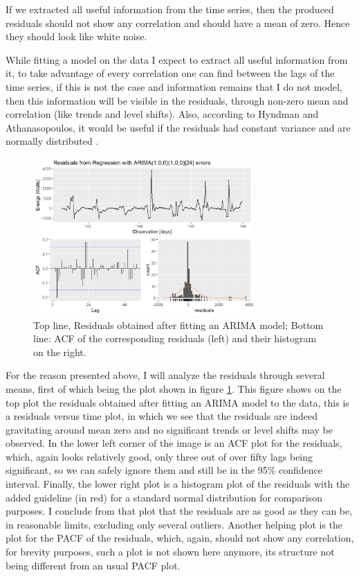 \documentclass[12pt,a4paper,titlepage]{report}
\begin{document}
If we extracted all useful information from the time series, then the produced residuals should not show any correlation and should have a mean of zero. Hence they should look like white noise. 

While fitting a model on the data I expect to extract all useful information from it, to take advantage of every correlation one can find between the lags of the time series, if this is not the case and information remains that I do not model, then this information will be visible in the residuals, through non-zero mean and correlation (like trends and level shifts). Also, according to Hyndman and Athanasopoulos, it would be useful if the residuals had constant variance and are normally distributed \cite{fpp2residuals}.

\begin{figure}[h]
    \centering
    \includegraphics[width=0.75\textwidth]{d1hrsph1residuals-0eb37d71c48b26211c0dcb74b7712259}
    \caption{Top line, Residuals obtained after fitting an ARIMA model; Bottom line: ACF of the corresponding residuals (left) and their histogram on the right.}
    \label{1hrsph1residuals-0eb37d71c48b26211c0dcb74b7712259}
\end{figure}

For the reason presented above, I will analyze the residuals through several means, first of which being the plot shown in figure \ref{1hrsph1residuals-0eb37d71c48b26211c0dcb74b7712259}. This figure shows on the top plot the residuals obtained after fitting an ARIMA model to the data, this is a residuals versus time plot, in which we see that the residuals are indeed gravitating around mean zero and no significant trends or level shifts may be observed. In the lower left corner of the image is an ACF plot for the residuals, which, again looks relatively good, only three out of over fifty lags being significant, so we can safely ignore them and still be in the 95\% confidence interval. Finally, the lower right plot is a histogram plot of the residuals with the added guideline (in red) for a standard normal distribution for comparison purposes. I conclude from that plot that the residuals are as good as they can be, in reasonable limits, excluding only several outliers.
Another helping plot is the plot for the PACF of the residuals, which, again, should not show any correlation, for brevity purposes, such a plot is not shown here anymore, its structure not being different from an usual PACF plot.
\end{document}
